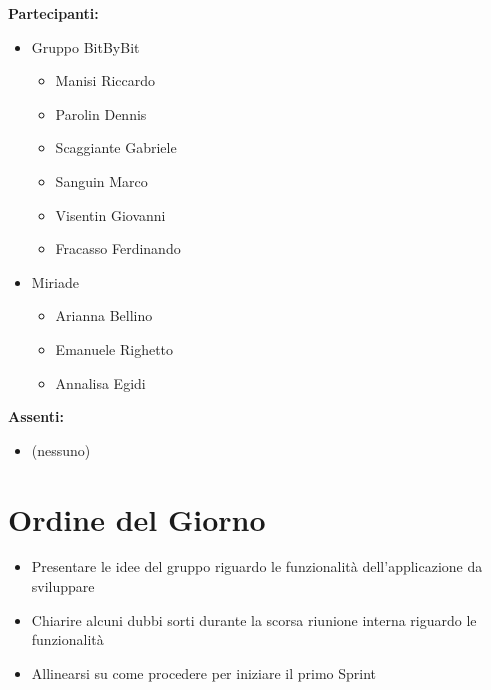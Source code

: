 \documentclass[a4paper,12pt]{article}
\begin{document}
	\vspace{0.4cm}
	\textbf{Partecipanti:}
	\begin{itemize}
		\item Gruppo BitByBit
		\begin{itemize}
			\item Manisi Riccardo
			\item Parolin Dennis
			\item Scaggiante Gabriele
			\item Sanguin Marco
			\item Visentin Giovanni
			\item Fracasso Ferdinando
		\end{itemize}
		
		\item Miriade
		\begin{itemize}
			\item Arianna Bellino
			\item Emanuele Righetto
			\item Annalisa Egidi
		\end{itemize}
	\end{itemize}
	
	\textbf{Assenti:}
	\begin{itemize}
		\item (nessuno)
	\end{itemize}
	
	\clearpage
	
	\vspace{0.5cm}
	
	\vspace{0.8cm}
	
	\clearpage
	\tableofcontents
	\thispagestyle{empty} %
	\clearpage
	
	\section{Ordine del Giorno}
	\begin{itemize}
		\item Presentare le idee del gruppo riguardo le funzionalit\`a dell'applicazione da sviluppare
		\item Chiarire alcuni dubbi sorti durante la scorsa riunione interna riguardo le funzionalit\`a
		\item Allinearsi su come procedere per iniziare il primo Sprint
	\end{itemize}
	
\end{document}
